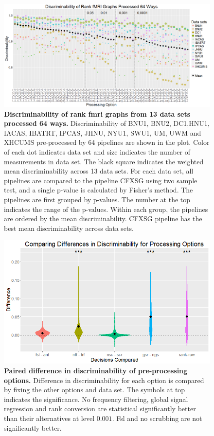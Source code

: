 \documentclass{article}
\begin{document}
\newpage
\begin{figure}[H]
	\includegraphics[width=\linewidth]{../Figs/fmri_rank_pv_v2.png}
	\caption{{\bf Discriminability of rank fmri graphs from 13 data sets processed 64 ways.}  Discriminability of BNU1, BNU2, DC1,HNU1, IACAS, IBATRT, IPCAS, JHNU, NYU1, SWU1, UM, UWM and XHCUMS pre-processed by 64 pipelines are shown in the plot. Color of each dot indicates data set and size indicates the number of measurements in data set. The black square indicates the weighted mean discriminability across 13 data sets.  For each data set, all pipelines are compared to the pipeline CFXSG using two sample test, and a single p-value is calculated by Fisher's method. The pipelines are first grouped by p-values. The number at the top indicates the range of the p-values. Within each group, the pipelines are ordered by the mean discriminability. CFXSG pipeline has the best mean discriminability across data sets.}
	\label{fig:pipes}
\end{figure}

\begin{figure}[H]
	\includegraphics[width=\linewidth]{../Figs/mri_decs.png}
	\caption{{ \bf Paired difference in discriminability of pre-processing options.} Difference in discriminability for each option is compared by fixing the other options and data set. The symbols at top indicates the significance. No frequency filtering, global signal regression and rank conversion are statistical significantly better than their alternatives at level $0.001$. Fsl and no scrubbing are not significantly better. }
	\label{fig:decs}
\end{figure}
\end{document}
